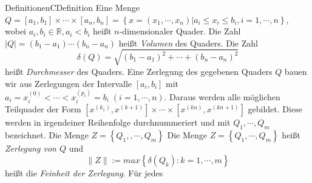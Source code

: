 \documentclass[a4paper]{memoir}
\begin{document}
\begin{ibox}[]{Definitionen}{CDefinition}
	Eine Menge $ Q = [a_1,b_1] \times \cdots \times [a_n, b_n] = \left\{ x = \left( x_1 , \cdots,  x_n \right) 
	| a_i \leq x_i \leq b_i, i = 1 , \cdots,  n \right\}  $, wobei $ a_i, b_i \in \mathbb{R}, a_i < b_i $ heißt $ n $-dimensionaler 
	Quader. Die Zahl $ | Q | = (b_1-a_1) \cdots (b_n-a_n) $ heißt \textit{Volumen} des Quaders. Die Zahl 
	$$ \delta (Q) = \sqrt{(b_1-a_1)^{2} + \cdots + (b_n-a_n)^{2} } $$
	heißt \textit{Durchmesser} des Quaders. Eine Zerlegung des gegebenen Quaders $ Q $ bauen wir aus Zerlegungen der Intervalle $ [a_i,b_i] $ 
	mit $ a_i = x_i^{(0)} < \cdots < x_i^{(p_i)} = b_i \; \left(  i = 1 , \cdots,  n \right)$. Daraus werden alle möglichen Teilquader der 
	Form $ \left[ x^{(k_1) }, x^{(k+1) } \right] \times \cdots \times \left[ x^{(kn) }, x^{(kn+1) } \right]  $ gebildet. Diese werden in 
	irgendeiner Reihenfolge durchnummeriert und mit $ Q_1 ,\cdots , Q_{m} $ bezeichnet. Die Menge $ Z = \left\{ Q_1, , \cdots,  Q_{m} \right\}$ 
	Die Menge $ Z = \left\{ Q_1 , \cdots,  Q_{m} \right\}  $ heißt \textit{Zerlegung von $ Q $ } und
	$$
	\|Z \| := max \left\{ \delta (Q_k) : k = 1 , \cdots,  m \right\} 
	$$ heißt die \textit{Feinheit der Zerlegung}. Für jedes 
\end{ibox}
\end{document}
